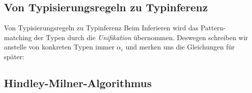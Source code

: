 \documentclass{beamer}
\begin{document}
\subsection{Von Typisierungsregeln zu Typinferenz}

\begin{frame}{Von Typisierungsregeln zu Typinferenz}
  Beim Inferieren wird das Pattern-matching der Typen durch die \emph{Unifikation} übernommen.
  Deswegen schreiben wir anstelle von konkreten Typen immer $\alpha_i$ und merken uns die Gleichungen für später:



\end{frame}

\subsection{Hindley-Milner-Algorithmus}
\end{document}
